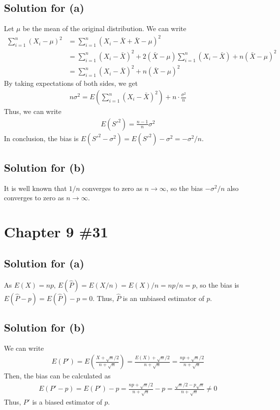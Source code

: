 \documentclass{scrartcl}
\begin{document}
\subsection{Solution for (a)}
Let \(\mu\) be the mean of the original distribution. We can write
\begin{align*}
  \sum^n_{i = 1} (X_i - \mu)^2
  &= \sum^n_{i = 1} (X_i - \bar{X} + \bar{X} - \mu)^2 \\
  &= \sum^n_{i = 1} (X_i - \bar{X})^2
    + 2(\bar{X} - \mu) \sum^n_{i = 1} (X_i - \bar{X})
    + n (\bar{X} - \mu)^2 \\
  &= \sum^n_{i = 1} (X_i - \bar{X})^2
    + n (\bar{X} - \mu)^2
\end{align*}
By taking expectations of both sides, we get
\begin{align*}
  n\sigma^2
  = E \left( \sum^n_{i = 1} (X_i - \bar{X})^2 \right)
    + n \cdot \frac{\sigma^2}{n}
\end{align*}
Thus, we can write
\begin{align*}
  E(S'^2)
  = \frac{n - 1}{n} \sigma^2
\end{align*}
In conclusion, the bias is \(E(S'^2 - \sigma^2) = E(S'^2) - \sigma^2 =
-\sigma^2 / n\).

\subsection{Solution for (b)}
It is well known that \(1 / n\) converges to zero as \(n \to \infty\), so the
bias \(-\sigma^2 / n\) also converges to zero as \(n \to \infty\).

\section{Chapter 9 \#31}
\subsection{Solution for (a)}
As \(E(X) = np\), \(E(\hat{P}) = E(X / n) = E(X) / n = np / n = p\), so the
bias is \(E(\hat{P} - p) = E(\hat{P}) - p = 0\). Thus, \(\hat{P}\) is an
unbiased estimator of \(p\).

\subsection{Solution for (b)}
We can write
\begin{align*}
  E(P')
  = E \left( \frac{X + \sqrt{n} / 2}{n + \sqrt{n}} \right)
  = \frac{E(X) + \sqrt{n} / 2}{n + \sqrt{n}}
  = \frac{np + \sqrt{n} / 2}{n + \sqrt{n}}
\end{align*}
Then, the bias can be calculated as
\begin{align*}
  E(P' - p)
  = E(P') - p
  = \frac{np + \sqrt{n} / 2}{n + \sqrt{n}} - p
  = \frac{\sqrt{n} / 2 - p\sqrt{n}}{n + \sqrt{n}}
  \not = 0
\end{align*}
Thus, \(P'\) is a biased estimator of \(p\).
\end{document}
